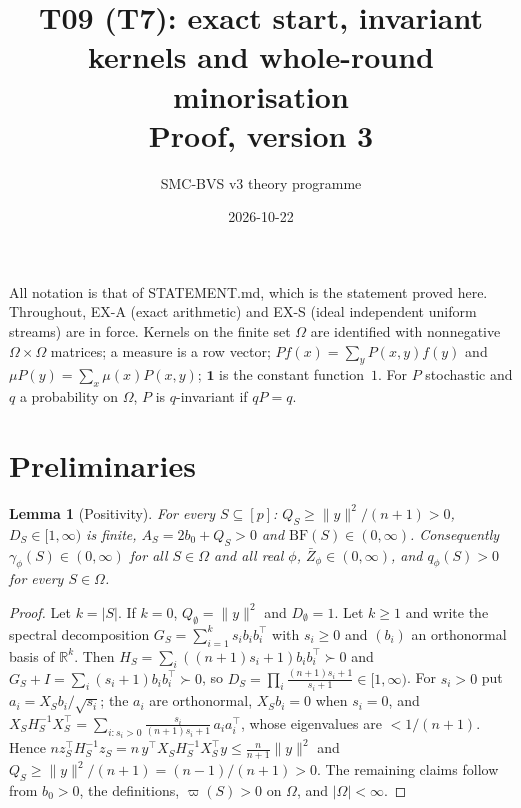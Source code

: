 \documentclass[11pt]{article}
\title{T09 (T7): exact start, invariant kernels and whole-round minorisation\\ \large Proof, version 3}
\author{SMC-BVS v3 theory programme}
\date{2026-10-22}
\newtheorem{lemma}[theorem]{Lemma}
\theoremstyle{remark}
\newcommand{\BF}{\mathrm{BF}}
\newcommand{\Om}{\Omega}
\newcommand{\Zb}{\bar Z}
\begin{document}
\maketitle

All notation is that of STATEMENT.md, which is the statement proved here. Throughout, EX-A (exact arithmetic) and EX-S (ideal independent uniform streams) are in force. Kernels on the finite set $\Om$ are identified with nonnegative $\Om\times\Om$ matrices; a measure is a row vector; $Pf(x)=\sum_y P(x,y)f(y)$ and $\mu P(y)=\sum_x\mu(x)P(x,y)$; $\mathbf 1$ is the constant function~$1$. For $P$ stochastic and $q$ a probability on $\Om$, $P$ is $q$-invariant if $qP=q$.

\section{Preliminaries}

\begin{lemma}[Positivity]\label{lem:pos}
For every $S\subseteq[p]$: $Q_S\ge \|y\|^2/(n+1)>0$, $D_S\in[1,\infty)$ is finite, $A_S=2b_0+Q_S>0$ and $\BF(S)\in(0,\infty)$. Consequently $\gamma_\phi(S)\in(0,\infty)$ for all $S\in\Om$ and all real $\phi$, $\Zb_\phi\in(0,\infty)$, and $q_\phi(S)>0$ for every $S\in\Om$.
\end{lemma}
\begin{proof}
Let $k=|S|$. If $k=0$, $Q_\emptyset=\|y\|^2$ and $D_\emptyset=1$. Let $k\ge1$ and write the spectral decomposition $G_S=\sum_{i=1}^k s_i b_ib_i^\top$ with $s_i\ge0$ and $(b_i)$ an orthonormal basis of $\mathbb R^k$. Then $H_S=\sum_i((n+1)s_i+1)b_ib_i^\top\succ0$ and $G_S+I=\sum_i(s_i+1)b_ib_i^\top\succ0$, so $D_S=\prod_i\frac{(n+1)s_i+1}{s_i+1}\in[1,\infty)$. For $s_i>0$ put $a_i=X_Sb_i/\sqrt{s_i}$; the $a_i$ are orthonormal, $X_Sb_i=0$ when $s_i=0$, and
$X_SH_S^{-1}X_S^\top=\sum_{i:s_i>0}\frac{s_i}{(n+1)s_i+1}\,a_ia_i^\top$, whose eigenvalues are $<1/(n+1)$. Hence $n z_S^\top H_S^{-1}z_S=n\,y^\top X_SH_S^{-1}X_S^\top y\le \frac{n}{n+1}\|y\|^2$ and $Q_S\ge\|y\|^2/(n+1)=(n-1)/(n+1)>0$. The remaining claims follow from $b_0>0$, the definitions, $\varpi(S)>0$ on $\Om$, and $|\Om|<\infty$.
\end{proof}
\end{document}
